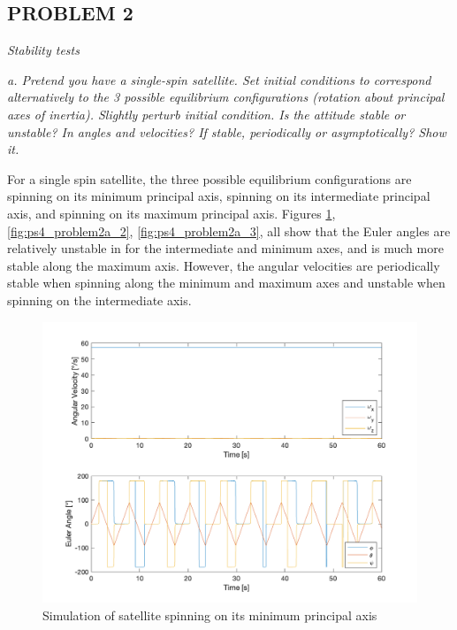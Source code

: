 \subsection{PROBLEM 2}
\textit{Stability tests}

\textit{a. Pretend you have a single-spin satellite. Set initial conditions to correspond alternatively to the 3 possible equilibrium configurations (rotation about principal axes of inertia). Slightly perturb initial condition. Is the attitude stable or unstable? In angles and velocities? If stable, periodically or asymptotically? Show it.}

For a single spin satellite, the three possible equilibrium configurations are spinning on its minimum principal axis, spinning on its intermediate principal axis, and spinning on its
maximum principal axis. Figures \ref{fig:ps4_problem2a_1}, \ref{fig:ps4_problem2a_2}, \ref{fig:ps4_problem2a_3}, all show that the Euler angles are relatively unstable in for the intermediate and minimum axes, and is much more stable along the maximum axis. However, the angular velocities are periodically stable when spinning along the minimum and maximum axes and unstable when spinning on the intermediate axis.

\begin{figure}[H]
\centering
\includegraphics[scale=0.6]{Images/ps4_problem2a_1.png}
\caption{Simulation of satellite spinning on its minimum principal axis}
\label{fig:ps4_problem2a_1}
\end{figure}

